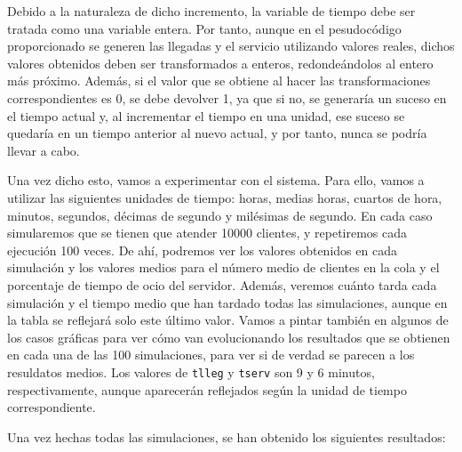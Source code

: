 \documentclass[11pt,a4paper]{article}
\begin{document}
Debido a la naturaleza de dicho incremento, la variable de tiempo debe ser tratada
como una variable entera. Por tanto, aunque en el pesudocódigo proporcionado se
generen las llegadas y el servicio utilizando valores reales, dichos valores obtenidos
deben ser transformados a enteros, redondeándolos al entero más próximo. Además, si
el valor que se obtiene al hacer las transformaciones correspondientes es 0, se
debe devolver 1, ya que si no, se generaría un suceso en el tiempo actual y, al
incrementar el tiempo en una unidad, ese suceso se quedaría en un tiempo anterior
al nuevo actual, y por tanto, nunca se podría llevar a cabo.

Una vez dicho esto, vamos a experimentar con el sistema. Para ello, vamos a utilizar
las siguientes unidades de tiempo: horas, medias horas, cuartos de hora, minutos, segundos,
décimas de segundo y milésimas de segundo. En cada caso simularemos que se tienen que
atender 10000 clientes, y repetiremos cada ejecución 100 veces. De ahí, podremos
ver los valores obtenidos en cada simulación y los valores medios para el número
medio de clientes en la cola y el porcentaje de tiempo de ocio del servidor. Además,
veremos cuánto tarda cada simulación y el tiempo medio que han tardado todas las simulaciones,
aunque en la tabla se reflejará solo este último valor. Vamos a pintar también en algunos de los
casos gráficas para ver cómo van evolucionando los resultados que se obtienen en cada una de las
100 simulaciones, para ver si de verdad se parecen a los resuldatos medios. Los valores de
\texttt{tlleg} y \texttt{tserv} son 9 y 6 minutos, respectivamente, aunque aparecerán reflejados
según la unidad de tiempo correspondiente.

Una vez hechas todas las simulaciones, se han obtenido los siguientes resultados:
\end{document}
